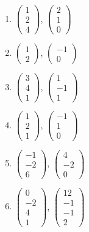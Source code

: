 \documentclass[11pt, a4paper]{extarticle}
\begin{document}
	\begin{multicols}{3}
		\begin{enumerate}[label=\alph*)]
			\item $\begin{pmatrix}
			1 \\
			2 \\
			4
			\end{pmatrix}$, $\begin{pmatrix}
			2 \\
			1 \\
			0
			\end{pmatrix}$
			\item $\begin{pmatrix}
			1 \\
			2
			\end{pmatrix}$, $\begin{pmatrix}
			-1 \\
			0
			\end{pmatrix}$
			\item $\begin{pmatrix}
			3 \\
			4 \\
			1
			\end{pmatrix}$, $\begin{pmatrix}
			1 \\
			-1 \\
			1
			\end{pmatrix}$
			\item $\begin{pmatrix}
			1 \\
			2 \\
			1
			\end{pmatrix}$, $\begin{pmatrix}
			-1 \\
			1 \\
			0
			\end{pmatrix}$
			\item $\begin{pmatrix}
			-1 \\
			-2 \\
			6
			\end{pmatrix}$, $\begin{pmatrix}
			4 \\
			-2 \\
			0
			\end{pmatrix}$
			\item $\begin{pmatrix}
			0 \\
			-2 \\
			4 \\
			1
			\end{pmatrix}$, $\begin{pmatrix}
			12 \\
			-1 \\
			-1 \\
			2
			\end{pmatrix}$
		\end{enumerate}
	\end{multicols}
\end{document}
